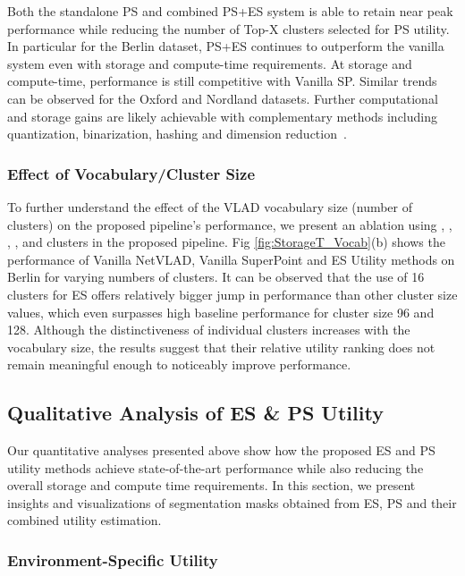 \documentclass[letterpaper, 10 pt, conference]{ieeeconf}  \fi
\begin{document}
Both the standalone PS and combined PS+ES system is able to retain near peak performance while reducing the number of Top-X clusters selected for PS utility. In particular for the Berlin dataset, PS+ES continues to outperform the vanilla system even with  storage and  compute-time requirements. At  storage and  compute-time, performance is still competitive with Vanilla SP. Similar trends can be observed for the Oxford and Nordland datasets. Further computational and storage gains are likely achievable with complementary methods including quantization, binarization, hashing and dimension reduction~\cite{arroyo2015towards,vysotska2017relocalization,jegou2010aggregating}. 

\subsubsection{Effect of Vocabulary/Cluster Size}
\label{sec:vocabSize}
To further understand the effect of the VLAD vocabulary size (number of clusters) on the proposed pipeline's performance, we present an ablation using , , , , and  clusters in the proposed pipeline. Fig \ref{fig:StorageT_Vocab}(b) shows the performance of Vanilla NetVLAD, Vanilla SuperPoint and ES Utility methods on Berlin for varying numbers of clusters. It can be observed that the use of 16 clusters for ES offers relatively bigger jump in performance than other cluster size values, which even surpasses high baseline performance for cluster size 96 and 128. Although the distinctiveness of individual clusters increases with the vocabulary size, the results suggest that their relative utility ranking does not remain meaningful enough to noticeably improve performance.

\subsection{Qualitative Analysis of ES \& PS Utility}
\label{sec:Qual}
Our quantitative analyses presented above show how the proposed ES and PS utility methods achieve state-of-the-art performance while also reducing the overall storage and compute time requirements. In this section, we present insights and visualizations of segmentation masks obtained from ES, PS and their combined utility estimation. 

\subsubsection{Environment-Specific Utility}
\label{sec:SemES}
\end{document}
